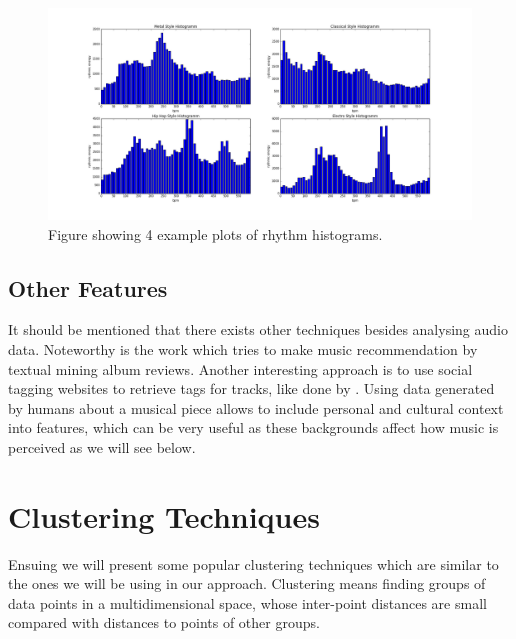 \documentclass[cic,tc,english]{iiufrgs}
\begin{document}
\begin{figure}
    \caption{Figure showing 4 example plots of rhythm histograms.}
    \begin{center}
        \includegraphics[trim=140 0 140 0, clip, width=\linewidth]{rhythm_hist}
    \end{center}
    \label{fig:rhythm_histo}
\end{figure}

\subsection{Other Features}
It should be mentioned that there exists other techniques besides analysing audio data. Noteworthy is the work \cite{vembu2005self} which tries to make music recommendation by textual mining album reviews. Another interesting approach is to use social tagging websites to retrieve tags for tracks, like done by \cite{hariri2012context}. Using data generated by humans about a musical piece allows to include personal and cultural context into features, which can be very useful as these backgrounds affect how music is perceived as we will see below.

\section{Clustering Techniques}
Ensuing we will present some popular clustering techniques which are similar to the ones we will be using in our approach. Clustering means finding groups of data points in a multidimensional space, whose inter-point distances are small compared with distances to points of other groups\cite{bishop2006pattern}.
\end{document}
